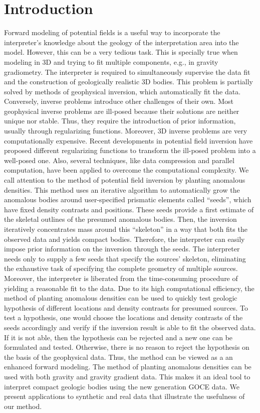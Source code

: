 \documentclass[twocolumn,draft]{svjour3}
\begin{document}
\section{Introduction}
\label{intro}

Forward modeling of potential fields
is a useful way to incorporate the interpreter's knowledge
about the geology of the interpretation area into the model.
However, this can be a very tedious task.
This is specially true when modeling in 3D
and trying to fit multiple components,
e.g., in gravity gradiometry.
The interpreter is required
to simultaneously supervise the data fit
and the construction of geologically realistic 3D bodies.
This problem is partially solved
by methods of geophysical inversion,
which automatically fit the data.
Conversely,
inverse problems introduce other challenges of their own.
Most geophysical inverse problems are ill-posed
because their solutions are neither unique nor stable.
Thus, they require the introduction of prior information,
usually through regularizing functions.
Moreover, 3D inverse problems are very computationally expensive.
Recent developments in potential field inversion
have proposed different regularizing functions
to transform the ill-posed problem into a well-posed one.
Also, several techniques,
like data compression and parallel computation,
have been applied to overcome the computational complexity.
We call attention to
the method of potential field inversion
by planting anomalous densities.
This method uses an iterative algorithm
to automatically grow the anomalous bodies
around user-specified prismatic elements called ``seeds'',
which have fixed density contrasts and positions.
These seeds provide a first estimate
of the skeletal outlines of the presumed anomalous bodies.
Then, the inversion iteratively concentrates mass around this ``skeleton''
in a way that both fits the observed data and yields compact bodies.
Therefore,
the interpreter can easily impose prior information
on the inversion through the seeds.
The interpreter needs only to supply a few seeds
that specify the sources' skeleton,
eliminating the exhaustive task
of specifying the complete geometry of multiple sources.
Moreover, the interpreter is liberated
from the time-consuming procedure
of yielding a reasonable fit to the data.
Due to its high computational efficiency,
the method of planting anomalous densities
can be used to quickly test geologic hypothesis
of different locations and density contrasts
for presumed sources.
To test a hypothesis,
one would choose
the locations and density contrasts of the seeds accordingly
and verify if the inversion result
is able to fit the observed data.
If it is not able,
then the hypothesis can be rejected
and a new one can be formulated and tested.
Otherwise, there is no reason to reject the hypothesis
on the basis of the geophysical data.
Thus, the method can be viewed as a an enhanced forward modeling.
The method of planting anomalous densities
can be used with both gravity and gravity gradient data.
This makes it an ideal tool
to interpret compact geologic bodies
using the new generation GOCE data.
We present  applications to synthetic and real data
that illustrate the usefulness of our method.
\end{document}
